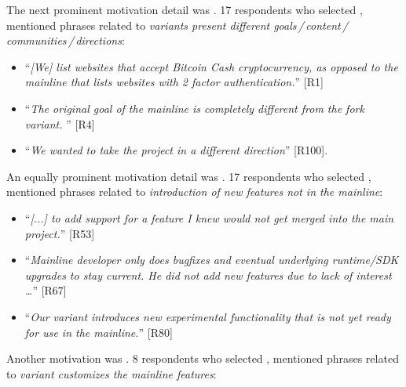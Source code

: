 \nd The next prominent  motivation detail was . 17 respondents who selected , mentioned phrases related to \emph{variants present different goals\,/\,content\,/\,communities\,/\,directions}:

\begin{itemize}[leftmargin=*]
\item ``\emph{[We] %
list websites that accept Bitcoin Cash cryptocurrency, as opposed to the mainline that lists websites with 2 factor authentication.}'' [R1]
\item ``\emph{The original goal of the mainline is completely different from the fork variant. %
}'' [R4]
\item  ``\emph{We wanted to take the project in a different direction}'' [R100].
\end{itemize}

\nd An equally prominent  motivation detail was .
17 respondents who selected , mentioned phrases related to \emph{introduction of new features not in the mainline}:

\begin{itemize}[leftmargin=*]
\item ``\emph{[...] to add support for a feature I knew would not get merged into the main project.}'' [R53]
\item ``\emph{Mainline developer only does bugfixes and eventual underlying runtime/SDK upgrades to stay current. He did not add new features due to lack of interest \ldots}'' [R67]
\item ``\emph{Our variant introduces new experimental functionality that is not yet ready for use in the mainline.}'' [R80]
\end{itemize}

\nd Another  motivation was .
8 respondents who selected , mentioned phrases related to \emph{variant customizes the mainline features}:

